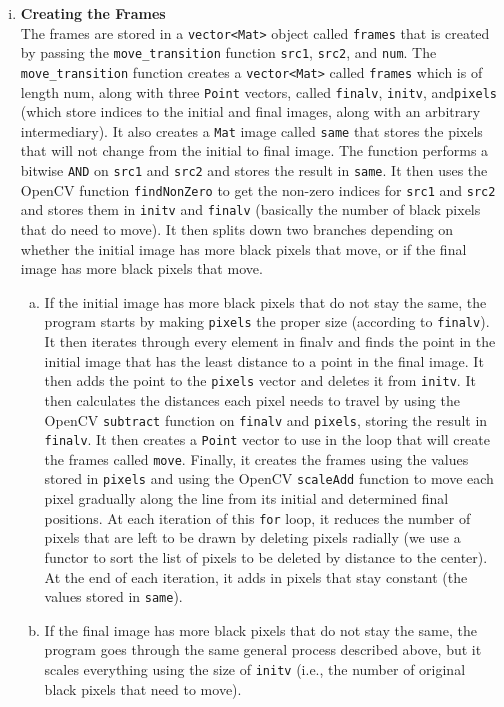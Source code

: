 \documentclass[12pt]{article}
\newcommand{\code}[1]{\texttt{#1}}
\begin{document}
\begin{enumerate}
\begin{enumerate}[i.]
\item \textbf{Creating the Frames} \\
The frames are stored in a \code{vector<Mat>} object called \code{frames} that is created by passing the \code{move\_transition} function \code{src1}, \code{src2}, and \code{num}. The \code{move\_transition} function creates a \code{vector<Mat>} called \code{frames} which is of length num, along with three \code{Point} vectors, called \code{finalv}, \code{initv}, and\code{pixels} (which store indices to the initial and final images, along with an arbitrary intermediary). It also creates a \code{Mat} image called \code{same} that stores the pixels that will not change from the initial to final image. The function performs a bitwise \code{AND} on \code{src1} and \code{src2} and stores the result in \code{same}. It then uses the OpenCV function \code{findNonZero} to get the non-zero indices for \code{src1} and \code{src2} and stores them in \code{initv} and \code{finalv} (basically the number of black pixels that do need to move). It then splits down two branches depending on whether the initial image has more black pixels that move, or if the final image has more black pixels that move.
\begin{enumerate}[(a)]
\item If the initial image has more black pixels that do not stay the same, the program starts by making \code{pixels} the proper size (according to \code{finalv}). It then iterates through every element in finalv and finds the point in the initial image that has the least distance to a point in the final image. It then adds the point to the \code{pixels} vector and deletes it from \code{initv}. It then calculates the distances each pixel needs to travel by using the OpenCV \code{subtract} function on \code{finalv} and \code{pixels}, storing the result in \code{finalv}. It then creates a \code{Point} vector to use in the loop that will create the frames called \code{move}. Finally, it creates the frames using the values stored in \code{pixels} and using the OpenCV \code{scaleAdd} function to move each pixel gradually along the line from its initial and determined final positions. At each iteration of this \code{for} loop, it reduces the number of pixels that are left to be drawn by deleting pixels radially (we use a functor to sort the list of pixels to be deleted by distance to the center). At the end of each iteration, it adds in pixels that stay constant (the values stored in \code{same}).

\item If the final image has more black pixels that do not stay the same, the program goes through the same general process described above, but it scales everything using the size of \code{initv} (i.e., the number of original black pixels that need to move).
\end{enumerate}


\end{enumerate}
\end{enumerate}
\end{document}
